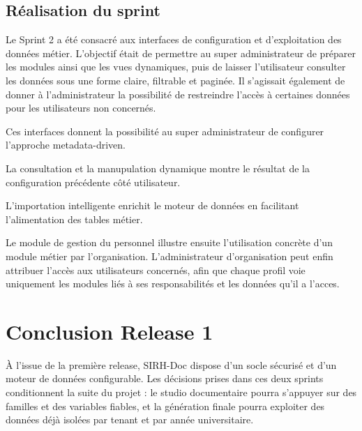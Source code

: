 \subsection{Réalisation du sprint}

Le Sprint 2 a été consacré aux interfaces de configuration et d’exploitation des données métier. L’objectif était de permettre au super administrateur de préparer les modules ainsi que les vues dynamiques, puis de laisser l’utilisateur consulter les données sous une forme claire, filtrable et paginée. Il s’agissait également de donner à l’administrateur la possibilité de restreindre l’accès à certaines données pour les utilisateurs non concernés.



Ces interfaces donnent la possibilité au super administrateur de configurer l’approche metadata-driven.


La consultation et la manupulation dynamique montre le résultat de la configuration précédente côté utilisateur.


L'importation intelligente enrichit le moteur de données en facilitant l’alimentation des tables métier.


Le module de gestion du personnel illustre ensuite l'utilisation concrète d'un module métier par l'organisation. L'administrateur d'organisation peut enfin attribuer l'accès aux utilisateurs concernés, afin que chaque profil voie uniquement les modules liés à ses responsabilités et les données qu'il a l'acces.


\section{Conclusion Release 1}

À l'issue de la première release, SIRH-Doc dispose d'un socle sécurisé et d'un moteur de données configurable. Les décisions prises dans ces deux sprints conditionnent la suite du projet : le studio documentaire pourra s'appuyer sur des familles et des variables fiables, et la génération finale pourra exploiter des données déjà isolées par tenant et par année universitaire.
